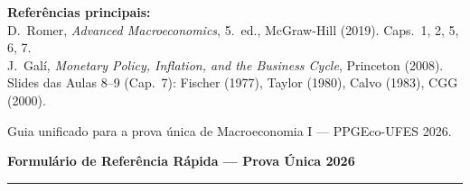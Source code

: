 \documentclass[12pt, a4paper]{article}
\begin{document}
\begin{titlepage}
\begin{center}
\vspace{1.5em}
\begin{tcolorbox}[standard, colback=boxbg, colframe=boxborder, width=0.92\textwidth,
  arc=4pt, boxrule=1pt, left=8pt, right=8pt, top=6pt, bottom=6pt]
\centering
\textbf{Referências principais:}\\[0.3em]
D.\ Romer, \textit{Advanced Macroeconomics}, 5.\textordfeminine\ ed., McGraw-Hill (2019). Caps.\ 1, 2, 5, 6, 7.\\[0.2em]
J.\ Galí, \textit{Monetary Policy, Inflation, and the Business Cycle}, Princeton (2008).\\[0.2em]
Slides das Aulas 8--9 (Cap.\ 7): Fischer (1977), Taylor (1980), Calvo (1983), CGG (2000).
\end{tcolorbox}

\vfill
{\small Guia unificado para a prova única de Macroeconomia I --- PPGEco-UFES 2026.}
\end{center}
\end{titlepage}

\newpage
\thispagestyle{fancy}

\begin{center}
{\large\bfseries\color{cyanrbc} Formulário de Referência Rápida --- Prova Única 2026}\\[0.3em]
\rule{\linewidth}{0.6pt}
\end{center}
\end{document}
